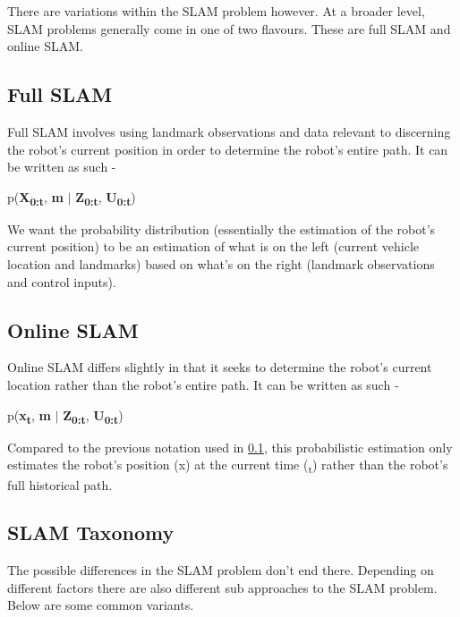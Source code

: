 			There are variations within the SLAM problem however. At a broader level, SLAM problems generally come in one of two flavours. These are full SLAM and online SLAM. 

				\subsection{Full SLAM}
				\label{litreview:slam:fullslam}
				Full SLAM involves using landmark observations and data relevant to discerning the robot's current position in order to determine the robot's entire path. It can be written as such -
				
				p(\textbf{X\textsubscript{0:t}}, \textbf{m} $\mid$ \textbf{Z\textsubscript{0:t}}, \textbf{U\textsubscript{0:t}})
				
				We want the probability distribution (essentially the estimation of the robot's current position) to be an estimation of what is on the left (current vehicle location and landmarks) based on what's on the right (landmark observations and control inputs).
				
				\subsection{Online SLAM}
				\label{litreview:slam:onlineslam}
				Online SLAM differs slightly in that it seeks to determine the robot's current location rather than the robot's entire path. It can be written as such - 
				
				p(\textbf{x\textsubscript{t}}, \textbf{m} $\mid$ \textbf{Z\textsubscript{0:t}}, \textbf{U\textsubscript{0:t}})
				
				Compared to the previous notation used in \ref{litreview:slam:fullslam}, this probabilistic estimation only estimates the robot's position (x) at the current time (\textsubscript{t}) rather than the robot's full historical path.
				
				\subsection{SLAM Taxonomy}
				The possible differences in the SLAM problem don't end there. Depending on different factors there are also different sub approaches to the SLAM problem. Below are some common variants.
				
